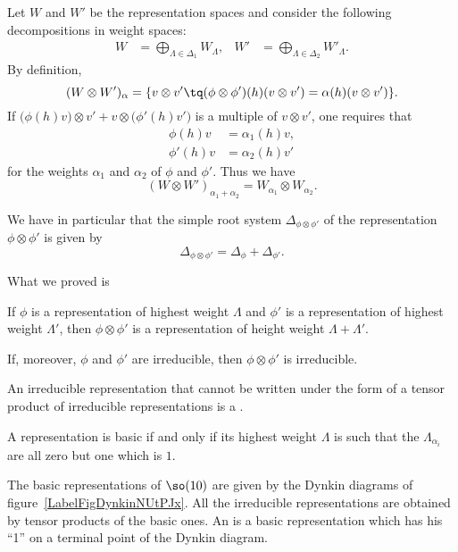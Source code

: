 Let $W$ and $W'$ be the representation spaces and consider the following decompositions in weight spaces:
\begin{align}
	W & =\bigoplus_{\Lambda\in\Delta_1}W_{\Lambda}, & W' & =\bigoplus_{\Lambda\in\Delta_2}W'_{\Lambda}.
\end{align}
By definition,
\begin{equation}
	(W\otimes W')_{\alpha}=\{ v\otimes v'\tq (\phi\otimes\phi')(h)(v\otimes v')=\alpha(h)(v\otimes v') \}.
\end{equation}
If $\big( \phi(h)v \big)\otimes v'+v\otimes\big( \phi'(h)v' \big)$ is a multiple of $v\otimes v'$, one requires that
\begin{subequations}
	\begin{align}
		\phi(h)v  & =\alpha_1(h)v, \\
		\phi'(h)v & =\alpha_2(h)v'
	\end{align}
\end{subequations}
for the weights $\alpha_1$ and $\alpha_2$ of $\phi$ and $\phi'$. Thus we have
\begin{equation}
	(W\otimes W')_{\alpha_1+\alpha_2}=W_{\alpha_1}\otimes W_{\alpha_2}.
\end{equation}

We have in particular that the simple root system $\Delta_{\phi\otimes\phi'}$ of the representation $\phi\otimes\phi'$ is given by
\begin{equation}        \label{EqDeldelDElphitens}
	\Delta_{\phi\otimes\phi'}= \Delta_{\phi}+\Delta_{\phi'}.
\end{equation}

What we proved is
\begin{proposition} \label{Propphihwrepplullllam}
	If $\phi$ is a representation of highest weight $\Lambda$ and $\phi'$ is a representation of highest weight $\Lambda'$, then $\phi\otimes\phi'$ is a representation of height weight $\Lambda+\Lambda'$.

	If, moreover, $\phi$ and $\phi'$ are irreducible, then $\phi\otimes\phi'$ is irreducible.
\end{proposition}

An irreducible representation that cannot be written under the form of a tensor product of irreducible representations is a .

\begin{lemma}
	A representation is basic if and only if its highest weight $\Lambda$ is such that the $\Lambda_{\alpha_i}$ are all zero but one which is $1$.
\end{lemma}
The basic representations of $\so(10)$ are given by the Dynkin diagrams of figure~\ref{LabelFigDynkinNUtPJx}. All the irreducible representations are obtained by tensor products of the basic ones. An  is a basic representation which has his ``1'' on a terminal point of the Dynkin diagram.
\newcommand{\CaptionFigDynkinNUtPJx}{Basic representations of $\so(10)$}


